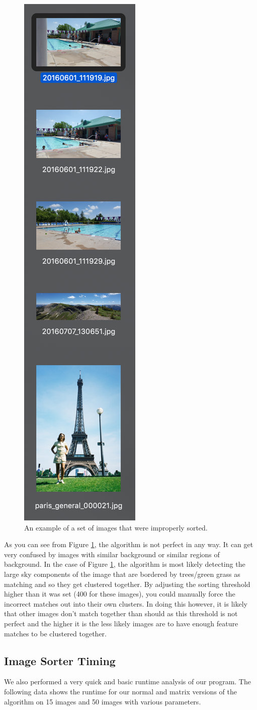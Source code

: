 \documentclass[12pt]{article}
\begin{document}
\begin{figure}[H]
	\centering
	\includegraphics[width=.2\textwidth]{images/wrong_match_1.png}
	\caption{An example of a set of images that were improperly sorted.}
	\label{fig:incorrect_sort}
\end{figure}

	As you can see from Figure \ref{fig:incorrect_sort}, the algorithm is not perfect in any way. It can get very confused by images with similar background or similar regions of background. In the case of Figure \ref{fig:incorrect_sort}, the algorithm is most likely detecting the large sky components of the image that are bordered by trees/green grass as matching and so they get clustered together. By adjusting the sorting threshold higher than it was set (400 for these images), you could manually force the incorrect matches out into their own clusters. In doing this however, it is likely that other images don't match together than should as this threshold is not perfect and the higher it is the less likely images are to have enough feature matches to be clustered together.

\subsection{Image Sorter Timing}
	We also performed a very quick and basic runtime analysis of our program. The following data shows the runtime for our normal and matrix versions of the algorithm on 15 images and 50 images with various parameters.
	
\end{document}
